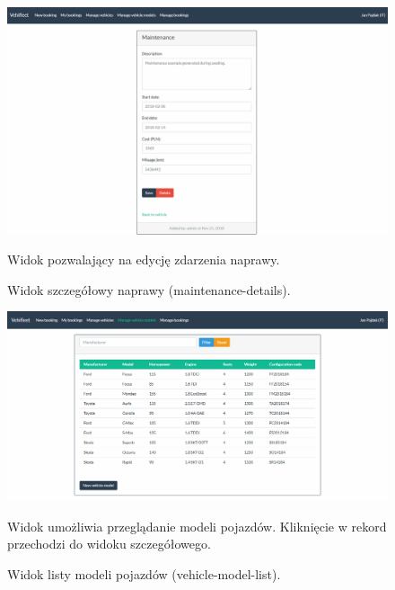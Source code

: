 \documentclass[eng,printmode,openany]{mgr}
\begin{document}
	\begin{figure}[H]
		\centering
		\includegraphics[width=\textwidth]{images/views/maintenance-detail.png}
		\caption{Widok szczegółowy naprawy (maintenance-details).}
		\small 
		Widok pozwalający na edycję zdarzenia naprawy.
	\end{figure}
	
	\begin{figure}[H]
		\centering
		\includegraphics[width=\textwidth]{images/views/vehicle-model-list.png}
		\caption{Widok listy modeli pojazdów (vehicle-model-list).}
		\small 
		Widok umożliwia przeglądanie modeli pojazdów. Kliknięcie w rekord przechodzi do widoku szczegółowego. 
	\end{figure}
	
\end{document}
